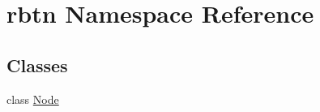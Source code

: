 \hypertarget{namespacerbtn}{}\section{rbtn Namespace Reference}
\label{namespacerbtn}
\subsection*{Classes}
\begin{DoxyCompactItemize}
\item 
class \hyperlink{classrbtn_1_1_node}{Node}
\end{DoxyCompactItemize}
